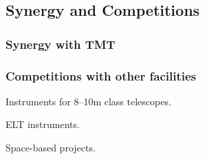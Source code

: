 \par{}

\par{}

\subsection{Synergy and Competitions}

\subsubsection{Synergy with TMT}

\subsubsection{Competitions with other facilities}

Instruments for 8--10m class telescopes.

ELT instruments.

Space-based projects.



